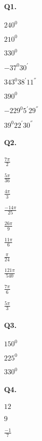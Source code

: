 \documentclass{article}
\begin{document}
\paragraph{Q1.}
\begin{enumerate*}[label=\alph*)]
          \item $240^{0}$
          \item $210^{0}$
          \item $330^{0}$
          \item $-37^{0}30^{'}$
          \item $343^{0}38^{'}11^{''}$
          \item $390^{0}$
          \item $-229^{0}5^{'}29^{''}$
          \item $39^{0}22^{'}30^{''}$
\end{enumerate*}

\paragraph{Q2.}
\begin{enumerate*}[label=\alph*)]
          \item $\frac{7\pi}{2}$
          \item $\frac{5\pi}{36}$
          \item $\frac{4\pi}{3}$
          \item $\frac{-14\pi}{25}$
          \item $\frac{26\pi}{9}$
          \item $\frac{11\pi}{6}$
          \item $\frac{\pi}{24}$
          \item $\frac{121\pi}{540}$
          \item $\frac{7\pi}{6}$
          \item $\frac{5\pi}{3}$
\end{enumerate*}

\paragraph{Q3.}
\begin{enumerate*}[label=\alph*)]
          \item $150^{0}$
          \item $225^{0}$
          \item $330^{0}$
\end{enumerate*}

\paragraph{Q4.}
\begin{enumerate*}[label=\alph*)]
          \item $12$
          \item $9$
          \item $\frac{-1}{7}$
\end{enumerate*}
\end{document}
